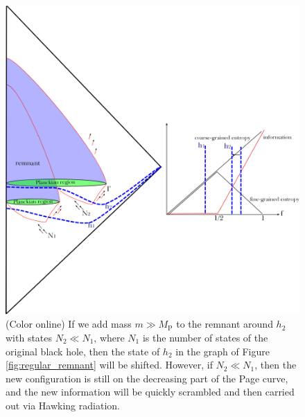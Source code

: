 \documentclass[12pt]{article}
\newcommand{\2}{$^2$}
\newcommand{\3}{$^3$}
\newcommand{\4}{$_4$}
\newcommand{\5}{$_5$}
\begin{document}
\begin{figure}
\begin{center}
\includegraphics[scale=0.45]{regular_remnant_duplication-eps-converted-to.pdf}
\caption{\label{fig:regular_remnant_duplication}(Color online) If we add mass $m \gg M_{\text{P}}$ to the remnant around $h_{2}$ with states $N_{2} \ll N_{1}$, where $N_{1}$ is the number of states of the original black hole, then the state of $h_{2}$ in the graph of Figure \ref{fig:regular_remnant} will be shifted. However, if $N_{2} \ll N_{1}$, then the new configuration is still on the decreasing part of the Page curve, and the new information will be quickly scrambled and then carried out via Hawking radiation.}
\end{center}
\end{figure}
\end{document}
